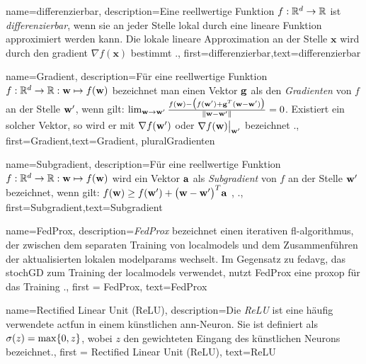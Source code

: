 {{{{{	
	{name={differenzierbar},
		description={Eine reellwertige Funktion $f: \mathbb{R}^{d} \rightarrow \mathbb{R}$ 
			ist \textit{differenzierbar}, wenn sie an jeder Stelle lokal durch eine lineare Funktion 
			approximiert werden kann. Die lokale lineare Approximation an der Stelle $\mathbf{x}$ 
			wird durch den \gls{gradient} $\nabla f ( \mathbf{x})$ bestimmt 
			\cite{RudinBookPrinciplesMatheAnalysis}.},
		first={differenzierbar},text={differenzierbar} 
	}
	
	{name={Gradient},
		description={Für eine reellwertige Funktion $f: \mathbb{R}^{d} \rightarrow \mathbb{R}: {\bf w} \mapsto f({\bf w})$ 
			bezeichnet man einen Vektor ${\bf g}$ als den \emph{Gradienten} von $f$ an der Stelle ${\bf w}'$, 
			wenn gilt: $\lim_{{\bf w} \rightarrow {\bf w}'} \frac{f({\bf w}) - \big(f({\bf w}')+ {\bf g}^{T} ({\bf w}- {\bf w}') \big) }{\| {\bf w}-{\bf w}'\|}=0$. 
			Existiert ein solcher Vektor, so wird er mit $\nabla f({\bf w}')$ oder $\nabla f({\bf w})\big|_{{\bf w}'}$ bezeichnet 
			\cite{RudinBookPrinciplesMatheAnalysis}.},
		first={Gradient},text={Gradient}, plural{Gradienten} 
	}

{name={Subgradient},
	description={Für eine reellwertige Funktion $f: \mathbb{R}^{d} \rightarrow \mathbb{R}: {\bf w} \mapsto f({\bf w})$ 
		wird ein Vektor ${\bf a}$ als \emph{Subgradient} von $f$ an der Stelle ${\bf w}'$ bezeichnet, 
		wenn gilt: $f({\bf w}) \geq f({\bf w}') + \big({\bf w} - {\bf w}' \big)^{T} {\bf a}$ 
		\cite{BertCvxAnalOpt}, \cite{BertsekasNonLinProgr}.},
	first={Subgradient},text={Subgradient} 
}

{name={FedProx},
	description={\textit{FedProx} bezeichnet einen iterativen \gls{fl}-\gls{algorithmus}, 
		der zwischen dem separaten Training von \gls{localmodel}s und dem Zusammenführen der aktualisierten lokalen \glspl{modelparam} wechselt. 
		Im Gegensatz zu \gls{fedavg}, das \gls{stochGD} zum Training der \gls{localmodel}s verwendet, 
		nutzt FedProx eine \gls{proxop} für das Training \cite{FedProx2020}.},
	first = {FedProx}, text={FedProx} 
}

{name={Rectified Linear Unit (ReLU)},
	description={Die \textit{ReLU} ist eine häufig verwendete \gls{actfun} 
		in einem künstlichen \gls{ann}-Neuron. Sie ist definiert als 
		$\sigma(z) = \max\{0,z\}$, wobei $z$ den gewichteten Eingang des künstlichen Neurons bezeichnet.},
	first = {Rectified Linear Unit (ReLU)}, text={ReLU} 
}

}}}}}
